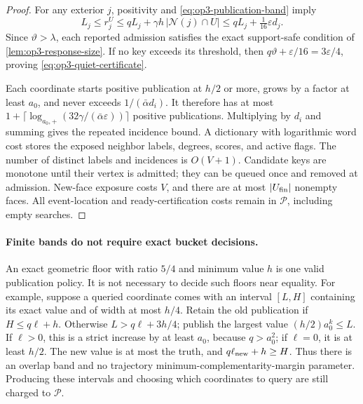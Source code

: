\begin{proof}
For any exterior $j$, positivity and \cref{eq:op3-publication-band} imply
\begin{equation}
 L_j\leq r_j^U
 \leq qL_j+\gamma h\,|\mathcal N(j)\cap U|
 \leq qL_j+\tfrac1{16}\varepsilon d_j.
 \label{eq:op3-signal-sandwich}
\end{equation}
Since $\vartheta>\lambda$, each reported admission satisfies the exact
support-safe condition of \cref{lem:op3-response-size}. If no key exceeds
its threshold, then
$q\vartheta+\varepsilon/16=3\varepsilon/4$, proving
\cref{eq:op3-quiet-certificate}.

Each coordinate starts positive publication at $h/2$ or more, grows by a
factor at least $a_0$, and never exceeds $1/(\bar\alpha d_i)$. It therefore
has at most
$1+\lceil\log_{a_0,+}(32\gamma/(\bar\alpha\varepsilon))\rceil$
positive publications. Multiplying by $d_i$ and summing gives the repeated
incidence bound. A dictionary with logarithmic word cost stores the
exposed neighbor labels, degrees, scores, and active flags. The number of
distinct labels and incidences is $O(V+1)$. Candidate keys are monotone
until their vertex is admitted; they can be queued once and removed at
admission. New-face exposure costs $V$, and there are at most $|U_{\rm fin}|$
nonempty faces. All event-location and ready-certification costs remain in
$\mathcal P$, including empty searches.
\end{proof}

\paragraph{Finite bands do not require exact bucket decisions.}
An exact geometric floor with ratio $5/4$ and minimum value $h$ is one
valid publication policy. It is not necessary to decide such floors near
equality. For example, suppose a queried coordinate comes with an interval
$[L,H]$ containing its exact value and of width at most $h/4$. Retain the
old publication if $H\leq q\ell+h$. Otherwise $L>q\ell+3h/4$; publish
the largest value $(h/2)a_0^k\leq L$. If $\ell>0$, this is a strict
increase by at least $a_0$, because $q>a_0^2$; if $\ell=0$, it is at least
$h/2$. The new value is at most the truth, and
$q\ell_{\rm new}+h\geq H$. Thus there is an overlap band and no
trajectory minimum-complementarity-margin parameter. Producing these
intervals and choosing which coordinates to query are still charged to
$\mathcal P$.

